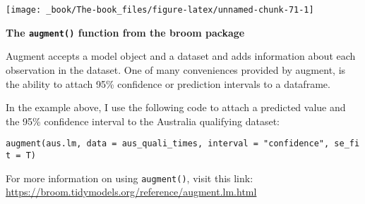 \documentclass[
]{book}
\begin{document}
\begin{center}\texttt{[image: \_book/The-book\_files/figure-latex/unnamed-chunk-71-1]} \end{center}

\begin{blackbox}

\begin{center}
\textbf{The \texttt{augment()} function from the broom package}

\end{center}

Augment accepts a model object and a dataset and adds information about each observation in the dataset. One of many conveniences provided by augment, is the ability to attach 95\% confidence or prediction intervals to a dataframe.

In the example above, I use the following code to attach a predicted value and the 95\% confidence interval to the Australia qualifying dataset:

\texttt{augment(aus.lm,\ data\ =\ aus\_quali\_times,\ interval\ =\ "confidence",\ se\_fit\ =\ T)}

For more information on using \texttt{augment()}, visit this link: \url{https://broom.tidymodels.org/reference/augment.lm.html}

\end{blackbox}
\end{document}
